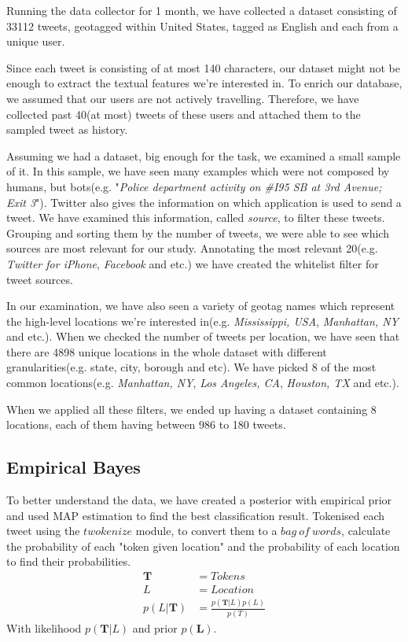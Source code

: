 \documentclass[twoside,11pt]{article}
\begin{document}
Running the data collector for 1 month, we have collected a dataset consisting of 33112 tweets, geotagged within United States, tagged as English and each from a unique user.

Since each tweet is consisting of at most 140 characters, our dataset might not be enough to extract the textual features we're interested in. To enrich our database, we assumed that our users are not actively travelling. Therefore, we have collected past 40(at most) tweets of these users and attached them to the sampled tweet as history.

Assuming we had a dataset, big enough for the task, we examined a small sample of it. In this sample, we have seen many examples which were not composed by humans, but bots(e.g. "\textit{Police department activity on \#I95 SB at 3rd Avenue; Exit 3}"). Twitter also gives the information on which application is used to send a tweet. We have examined this information, called \textit{source}, to filter these tweets. Grouping and sorting them by the number of tweets, we were able to see which sources are most relevant for our study. Annotating the most relevant 20(e.g. \textit{Twitter for iPhone}, \textit{Facebook} and etc.) we have created the whitelist filter for tweet sources.

In our examination, we have also seen a variety of geotag names which represent the high-level locations we're interested in(e.g. \textit{Mississippi, USA}, \textit{Manhattan, NY} and etc.). When we checked the number of tweets per location, we have seen that there are 4898 unique locations in the whole dataset with different granularities(e.g. state, city, borough and etc). We have picked 8 of the most common locations(e.g. \textit{Manhattan, NY}, \textit{Los Angeles, CA}, \textit{Houston, TX} and etc.). 

When we applied all these filters, we ended up having a dataset containing 8 locations, each of them having between 986 to 180 tweets.

\subsection{Empirical Bayes}
To better understand the data, we have created a posterior with empirical prior\cite{carlin1997bayes} and used MAP estimation\cite{degrooth} to find the best classification result. Tokenised each tweet using the $twokenize$ module\cite{gimpel2011part}, to convert them to a $bag\ of\ words$, calculate the probability of each "token given location" and the probability of each location to find their probabilities. 
\begin{equation*}
\begin{split}
\mathbf{T} &= Tokens \\
L &= Location \\
p(L|\mathbf{T}) &= \frac{p(\mathbf{T} | L)p(L)}{p(T)}
\end{split}
\end{equation*}
With likelihood $p(\mathbf{T} | L)$ and prior $p(\mathbf{L})$. 
\end{document}

